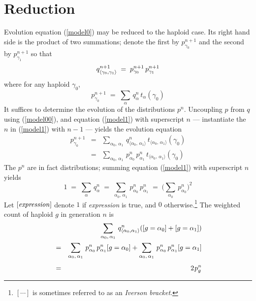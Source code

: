 \section{Reduction}

Evolution equation (\ref{model0}) may be reduced to the haploid case.
Its right hand side is the product of two summations; denote the first
by $p_{\gamma_0}^{n+1}$ and the second by $p_{\gamma_1}^{n+1}$ so that
\begin{equation}
\label{model1}
q_{\langle \gamma_0, \gamma_1 \rangle}^{n+1} \; = \;
p_{\gamma_0}^{n+1} \, p_{\gamma_1}^{n+1}\\[.05in]
\end{equation}
where for any haploid $\gamma_0$,
\begin{equation}
\label{model00}
p_{\gamma_0}^{n+1} \; = \;
\sum_{\alpha} \,q_\alpha^n \, t_\alpha(\gamma_0)
\end{equation}
It suffices to determine the evolution of the distributions $p^{n}$.
Uncoupling \nudge $p$ \nudge from \nudge $q$ \nudge using
(\ref{model00}), and equation (\ref{model1}) with superscript $n$ ---
instantiate the $n$ in (\ref{model1}) with $n-1$ --- yields the
evolution equation
\begin{eqnarray}
\label{model2}
p_{\gamma_0}^{n+1} & = &
\sum_{\alpha_0, \, \alpha_1} \, q_{\langle \alpha_0, \,\alpha_1 \rangle}^n \,
t_{\langle \alpha_0, \,\alpha_1 \rangle}(\gamma_0) \nonumber \\
& = &
\sum_{\alpha_0, \, \alpha_1} \, p_{\alpha_0}^n \, p_{\alpha_1}^n \,
t_{\langle \alpha_0, \,\alpha_1 \rangle}(\gamma_0) 
\end{eqnarray}
The $p^n$ are in fact distributions; summing equation
(\ref{model1}) with superscript $n$ yields
\[
1 \; = \; \sum_\alpha \, q_\alpha^n \; = \;
\sum_{\alpha_0, \, \alpha_1} \, p_{\alpha_0}^n \, p_{\alpha_1}^n \; = \;
\Big( \sum_{\alpha_0} \, p_{\alpha_0}^n \Big)^2
\]
Let $[\mbox{\em expression\/} ]$ denote $1$ if {\em expression\/} is
true, and $0$ otherwise.\footnote{$[ \cdots ]$ is sometimes referred to
  as an {\em Iverson bracket}.}  The weighted count of haploid
$g$ in generation $n$ is
\begin{eqnarray}
\label{project}
  & &
  \sum_{\alpha_0, \, \alpha_1} \, q_{\langle \alpha_0, \alpha_1 \rangle}^n
([g = \alpha_0] + [g = \alpha_1]) \\ & = &
\sum_{\alpha_0, \, \alpha_1} \, p_{\alpha_0}^n \, p_{\alpha_1}^n [g = \alpha_0] + 
\sum_{\alpha_0, \, \alpha_1} \, p_{\alpha_0}^n \, p_{\alpha_1}^n [g = \alpha_1] \\[0.05in]
& = & 2 \hspace{0.01in} p_g^n
\end{eqnarray}

